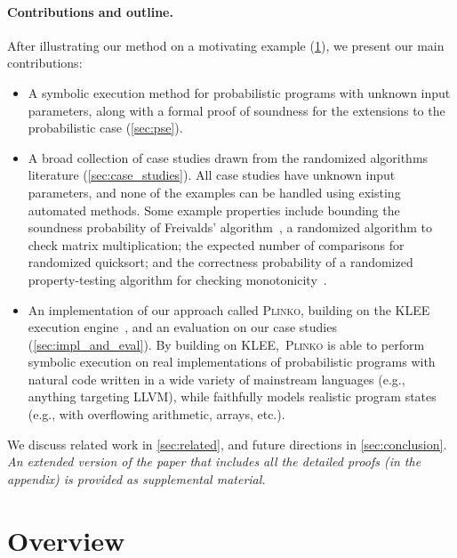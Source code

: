 \documentclass[acmsmall,review,anonymous]{acmart}\settopmatter{printfolios=true,printccs=false,printacmref=false}
\newcommand{\SYSTEM}{\textsc{Plinko}\xspace}
\begin{document}
\paragraph*{Contributions and outline.}
After illustrating our method on a motivating example (\cref{sec:overview}), we
present our main contributions:
% 
\begin{itemize}
\item A symbolic execution method for probabilistic programs with unknown
  input parameters, along with a formal proof of soundness for the extensions
  to the probabilistic case (\cref{sec:pse}).
\item A broad collection of case studies drawn from the randomized algorithms
  literature (\cref{sec:case_studies}). All case studies have unknown input
  parameters, and none of the examples can be handled using existing automated
  methods. Some example properties include bounding the soundness probability of
  Freivalds' algorithm~\citep{freivalds1977}, a randomized algorithm to check
  matrix multiplication; the expected number of comparisons for randomized
  quicksort; and the correctness probability of a randomized property-testing
  algorithm for checking monotonicity~\citep{goldreich_2017}.
\item An implementation of our approach called \SYSTEM, building on the KLEE
  execution engine~\citep{cadar2008}, and an evaluation on our case studies
  (\cref{sec:impl_and_eval}). By building on KLEE,~\SYSTEM is able to
  perform symbolic execution on real implementations of probabilistic programs
  with natural code written in a wide variety of mainstream languages (e.g.,
  anything targeting LLVM), while faithfully models realistic program states
  (e.g., with overflowing arithmetic, arrays, etc.).
\end{itemize}
% 
We discuss related work in \cref{sec:related}, and future directions in
\cref{sec:conclusion}. \emph{An extended version of the paper that includes all the detailed proofs (in the appendix) is provided as supplemental material.}

\section{Overview}
\label{sec:overview}
\end{document}
